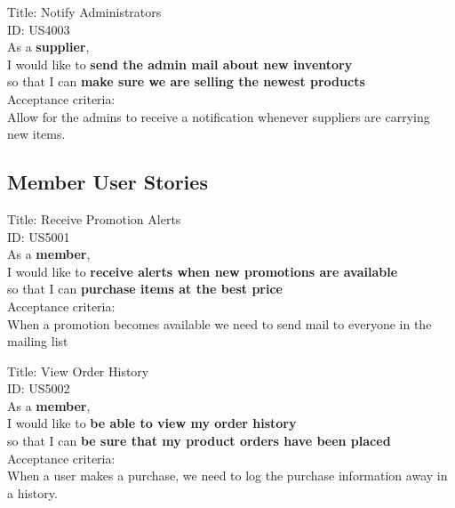 \documentclass{article}
\begin{document}
\begin{framed}
\noindent
Title:  Notify Administrators \\
ID: US4003 \\
As a \textbf{supplier},\\
 \textbullet  \quad \quad I would like to \textbf{send the admin mail about new inventory }\\ 
 \textbullet  \quad \quad so that I can \textbf{make sure we are selling the newest products}\\
 Acceptance criteria: \\
  \textbullet  \quad \quad Allow for the admins to receive a notification whenever suppliers are carrying new items.
\end{framed}

\subsection{Member User Stories}

\begin{framed}
\noindent
Title:  Receive Promotion Alerts \\
ID: US5001 \\
As a \textbf{member},\\
 \textbullet  \quad \quad I would like to \textbf{receive alerts when new promotions are available }\\ 
 \textbullet  \quad \quad so that I can \textbf{purchase items at the best price}\\
 Acceptance criteria: \\
  \textbullet  \quad \quad When a promotion becomes available we need to send mail to everyone in the mailing list
\end{framed}


\begin{framed}
\noindent
Title:  View Order History \\
ID: US5002 \\
As a \textbf{member},\\
 \textbullet  \quad \quad I would like to \textbf{be able to view my order history }\\ 
 \textbullet  \quad \quad so that I can \textbf{be sure that my product orders have been placed}\\
 Acceptance criteria: \\
  \textbullet  \quad \quad When a user makes a purchase, we need to log the purchase information away in a history.
\end{framed}
\end{document}
